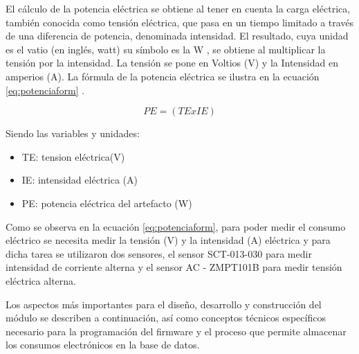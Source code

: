 \vspace{0.1cm}

El cálculo de la potencia eléctrica se obtiene al tener en cuenta la carga eléctrica, también conocida como tensión eléctrica, que pasa en un tiempo limitado a través de una diferencia de potencia, denominada intensidad. El resultado, cuya unidad es el vatio (en inglés, watt) su símbolo es la W , se obtiene al multiplicar la tensión por la intensidad. La tensión se pone en Voltios (V) y la Intensidad en amperios (A). La fórmula de la potencia eléctrica se ilustra en la ecuación \ref{eq:potenciaform} \citep{WEBSITE:20}.

\begin{equation}
	\label{eq:potenciaform}
	PE = \left( TE x IE \right)
\end{equation}

\vspace{0.2cm}
Siendo las variables y unidades:
\begin{itemize}
\item TE: tension eléctrica(V)
\item IE: intensidad eléctrica (A)
\item PE: potencia eléctrica del artefacto (W)
\end{itemize}


Como se observa en la ecuación \ref{eq:potenciaform}, para poder medir el consumo eléctrico se necesita medir la tensión (V) y la intensidad (A) eléctrica y para dicha tarea se utilizaron dos sensores, el sensor SCT-013-030 para medir intensidad de corriente alterna y el sensor AC - ZMPT101B para medir tensión eléctrica alterna.

Los aspectos más importantes para el diseño, desarrollo y construcción del módulo se describen  a continuación, así como conceptos técnicos específicos necesario para la programación del firmware y el proceso que permite almacenar los consumos electrónicos en la base de datos.


